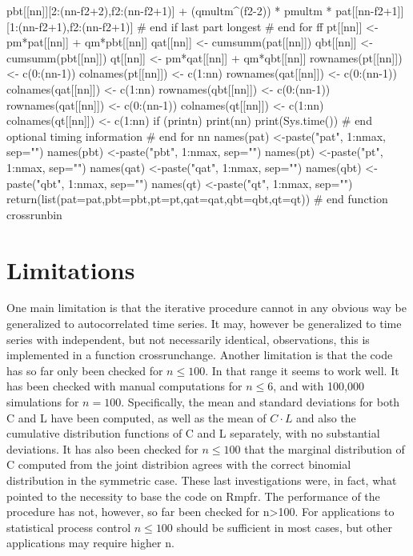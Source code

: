 \begin{example}
{{{{          pbt[[nn]][2:(nn-f2+2),f2:(nn-f2+1)] +
          (qmultm^(f2-2)) * pmultm * pat[[nn-f2+1]][1:(nn-f2+1),f2:(nn-f2+1)]
      } # end if last part longest
    } # end for ff
    pt[[nn]] <- pm*pat[[nn]] + qm*pbt[[nn]]
    qat[[nn]] <- cumsumm(pat[[nn]])
    qbt[[nn]] <- cumsumm(pbt[[nn]])
    qt[[nn]] <- pm*qat[[nn]] + qm*qbt[[nn]]
    rownames(pt[[nn]]) <- c(0:(nn-1))
    colnames(pt[[nn]]) <- c(1:nn)
    rownames(qat[[nn]]) <- c(0:(nn-1))
    colnames(qat[[nn]]) <- c(1:nn)
    rownames(qbt[[nn]]) <- c(0:(nn-1))
    rownames(qat[[nn]]) <- c(0:(nn-1))
    colnames(qt[[nn]]) <- c(1:nn)
    colnames(qt[[nn]]) <- c(1:nn)
    if (printn) {
      print(nn)
      print(Sys.time())
    } # end optional timing information
  } # end for nn
  names(pat) <-paste("pat", 1:nmax, sep="")
  names(pbt) <-paste("pbt", 1:nmax, sep="")
  names(pt) <-paste("pt", 1:nmax, sep="")
  names(qat) <-paste("qat", 1:nmax, sep="")
  names(qbt) <-paste("qbt", 1:nmax, sep="")
  names(qt) <-paste("qt", 1:nmax, sep="")
  return(list(pat=pat,pbt=pbt,pt=pt,qat=qat,qbt=qbt,qt=qt))
} # end function crossrunbin
\end{example}

\section{Limitations}

One main limitation is that the iterative procedure cannot in any obvious way be generalized to autocorrelated time series. It may, however be generalized to time series with independent, but not necessarily identical, observations, this is implemented in a function crossrunchange. Another limitation is that the code has so far only been checked for $n \leq 100$. In that range it seems to work well. It has been checked with manual computations for $n \leq 6$, and with 100,000 simulations for $n=100$. Specifically, the mean and standard deviations for both C and L have been computed, as well as the mean of $C \cdot L$ and also the cumulative distribution functions of C and L separately, with no substantial deviations. It has also been checked for $n \leq 100$ that the marginal distribution of C computed from the joint distribion agrees with the correct binomial distribution in the symmetric case. These last investigations were, in fact, what pointed to the necessity to base the code on Rmpfr. The performance of the procedure has not, however, so far been checked for n>100. For applications to statistical process control $n \leq 100$ should be sufficient in most cases, but other applications may require higher n.


